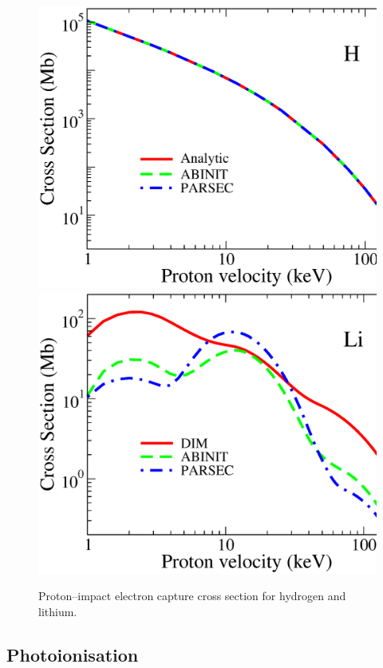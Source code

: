 \documentclass[10pt]{article}
\providecommand{\DIFaddbegin}{} %
\providecommand{\DIFaddend}{} %
\providecommand{\DIFdelbegin}{} %
\providecommand{\DIFdelend}{} %
\newcommand{\DIFscaledelfig}{0.5}
\newlength{\DIFdelgraphicswidth} %
\newlength{\DIFdelgraphicsheight} %
\newcommand{\DIFaddincludegraphics}[2][]{{\color{blue}\fbox{\DIFOincludegraphics[#1]{#2}}}} %
\newcommand{\DIFdelincludegraphics}[2][]{%
\sbox{\DIFdelgraphicsbox}{\DIFOincludegraphics[#1]{#2}}%
\settoboxwidth{\DIFdelgraphicswidth}{\DIFdelgraphicsbox} %
\settoboxtotalheight{\DIFdelgraphicsheight}{\DIFdelgraphicsbox} %
\scalebox{\DIFscaledelfig}{%
\parbox[b]{\DIFdelgraphicswidth}{\usebox{\DIFdelgraphicsbox}\\[-\baselineskip] \rule{\DIFdelgraphicswidth}{0em}}\llap{\resizebox{\DIFdelgraphicswidth}{\DIFdelgraphicsheight}{%
\setlength{\unitlength}{\DIFdelgraphicswidth}%
\begin{picture}(1,1)%
\thicklines\linethickness{2pt} %
{\color[rgb]{1,0,0}\put(0,0){\framebox(1,1){}}}%
{\color[rgb]{1,0,0}\put(0,0){\line( 1,1){1}}}%
{\color[rgb]{1,0,0}\put(0,1){\line(1,-1){1}}}%
\end{picture}%
}\hspace*{3pt}}} %
} %
\DeclareRobustCommand{\DIFaddbegin}{\DIFOaddbegin \let\includegraphics\DIFaddincludegraphics} %
\DeclareRobustCommand{\DIFaddend}{\DIFOaddend \let\includegraphics\DIFOincludegraphics} %
\DeclareRobustCommand{\DIFdelbegin}{\DIFOdelbegin \let\includegraphics\DIFdelincludegraphics} %
\DeclareRobustCommand{\DIFdelend}{\DIFOaddend \let\includegraphics\DIFOincludegraphics} %
\begin{document}
\begin{figure}[H]
\centering
 \includegraphics[height=0.23\textheight]{figures/pseudopot/captureH.eps}
 \hspace{0.3cm}
 \includegraphics[height=0.23\textheight]{figures/pseudopot/captureLi.eps}
 \caption{Proton--impact electron capture cross section for hydrogen and 
 lithium.}
 \label{fig:captureH}
\end{figure}

\subsection{Photoionisation}
\DIFdelbegin %
\DIFdelend \DIFaddbegin \label{sec:photoatom}
\DIFaddend 
\end{document}
